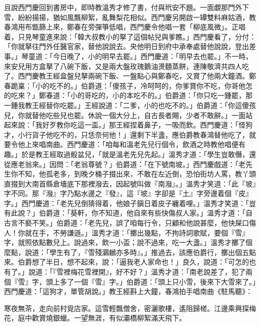 且說西門慶回到書房中，即時教溫秀才修了書，付與玳安不題。一面覷那門外下雪，紛紛揚揚，猶如風飄柳絮，亂舞梨花相似。西門慶另開啟一罈雙料麻姑酒，教春鴻用布甑篩上來，鄭春在旁彈箏低唱，西門慶令他唱一套「柳底風微」。正唱着，只見琴童進來說：「韓大叔教小的拏了這個帖兒與爹瞧。」西門慶看了，分付：「你就拏往門外任醫官家，替他說說去。央他明日到府中承奉處替他說說，登出差事。」琴童道：「今日晚了，小的明早去罷。」西門慶道：「明早去也罷。」不一時，來安兒用方盒拏了八碗下飯，又是兩大盤玫瑰鵝油燙麵蒸餅，連陳敬濟共四人吃了。西門慶教王經盒盤兒拏兩碗下飯、一盤點心與鄭春吃，又賞了他兩大鐘酒。鄭春跪稟：「小的吃不的。」伯爵道：「傻孩子，冷呵呵的，你爹賞你不吃，你哥他怎的吃來？」鄭春道：「小的哥吃的，小的本吃不的。」伯爵道：「你只吃一鍾罷，那一鍾我教王經替你吃罷。」王經說道：「二爹，小的也吃不的。」伯爵道：「你這傻孩兒，你就替他吃些兒也罷。休說一個大分上，自古長者賜，少者不敢辭。」一面站起來說：「我好歹教你吃這一盃。」那王經捏着鼻子，一吸而飲。西門慶道：「怪狗才，小行貨子他吃不的，只恁奈何他！」還剩下半盞，應伯爵教春鴻替他吃了，就要令他上來唱南曲。西門慶道：「咱每和溫老先兒行個令，飲酒之時教他唱便有趣。」{}於是教王經取過骰盆兒，「就是溫老先兒先起。」溫秀才道：「學生豈敢僭，還從應老翁來。」因問：「老翁尊號？」伯爵道：「在下號南坡。」西門慶戲道：「老先生你不知，他孤老多，到晚夕桶子掇出來，不敢在左近倒，恐怕街坊人罵，教丫頭直掇到大南首縣倉墻底下那裡潑去，因起號叫做『南潑』。」溫秀才笑道：「此『坡』字不同。那『潑』字乃點水邊之『發』，這『坡』字卻是『土』字旁邊着個『皮』字。」{}西門慶道：「老先兒倒猜得着，他娘子鎭日着皮子纏着哩。」{}溫秀才笑道：「豈有此說？」伯爵道：「葵軒，你不知道，他自來有些快傷叔人家。」溫秀才道：「自古言不褻不笑。」伯爵道：「老先兒，誤了咱每行令，只顧和他說甚麼，他快屎口傷人！你就在手，不勞謙遜。」溫秀才道：「擲出幾點，不拘詩詞歌賦，要個『雪』字，就照依點數兒上。說過來，飲一小盃；說不過來，吃一大盞。」溫秀才擲了個麼點，說道：「學生有了，『雪殘鸂鶒亦多時』。」推過去，該應伯爵行，擲出個五點來。伯爵想了半日，想不起來，說：「逼我老人家命也！」良久，說道：「可怎的也有了。」說道：「『雪裡梅花雪裡開』，好不好？」溫秀才道：「南老說差了，犯了兩個『雪』字，頭上多了一個『雪』字。」伯爵道：「頭上只小雪，後來下大雪來了。」西門慶道：「這狗才，單管胡說。」教王經斟上大鐘，春鴻拍手唱南曲《駐馬聽》：

\begin{myquote}
寒夜無茶，走向前村覓店家。這雪輕飄僧舍，密灑歌樓，遙阻歸槎。江邊乘興探梅花，庭中歡賞燒銀蠟。一望無涯，有似灞橋柳絮滿天飛下。
\end{myquote}

